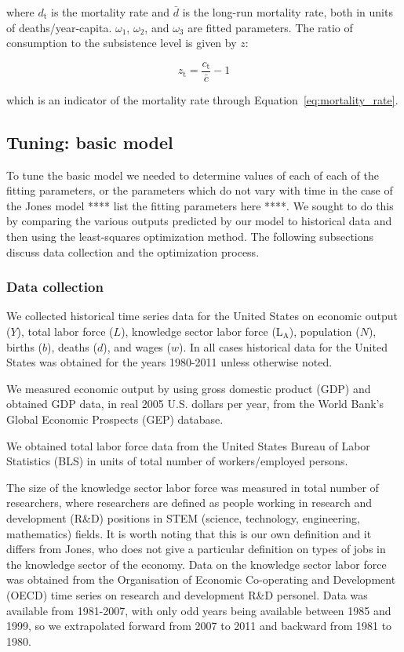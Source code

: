 \documentclass[letterpaper,12pt]{article}
\begin{document}
\noindent where $d_\mathrm{t}$ is the mortality rate and $\bar d$ is the long-run mortality rate, both in units of deaths/year-capita. $\omega_\mathrm{1}$, $\omega_\mathrm{2}$, and $\omega_\mathrm{3}$ are fitted parameters. The ratio of consumption to the subsistence level is given by $z$:

\begin{equation} \label{eq:z}
	z_\mathrm{t} = \frac{c_\mathrm{t}}{\bar c} - 1
\end{equation}

\noindent which is an indicator of the mortality rate through Equation~\ref{eq:mortality_rate}.

\subsection{Tuning: basic model}
\label{sec:Tuning_basic_model}

To tune the basic model we needed to determine values of each of each of the fitting parameters, or the parameters which do not vary with time in the case of the Jones model **** list the fitting parameters here ****. We sought to do this by comparing the various outputs predicted by our model to historical data and then using the least-squares optimization method. The following subsections discuss data collection and the optimization process.

\subsubsection{Data collection}
We collected historical time series data for the United States on economic output ($Y$), total labor force ($L$), knowledge sector labor force (L$_\mathrm{A}$), population ($N$), births ($b$), deaths ($d$), and wages ($w$). In all cases historical data for the United States was obtained for the years 1980-2011 unless otherwise noted. 

We measured economic output by using gross domestic product (GDP) and obtained GDP data, in real 2005 U.S. dollars per year, from the World Bank's Global Economic Prospects (GEP) database. 

We obtained total labor force data from the United States Bureau of Labor Statistics (BLS) in units of total number of workers/employed persons.

The size of the knowledge sector labor force was measured in total number of researchers, where researchers are defined as people working in research and development (R\&D) positions in STEM (science, technology, engineering, mathematics) fields. It is worth noting that this is our own definition and it differs from Jones, who does not give a particular definition on types of jobs in the knowledge sector of the economy. Data on the knowledge sector labor force was obtained from the Organisation of Economic Co-operating and Development (OECD) time series on research and development R\&D personel. Data was available from 1981-2007, with only odd years being available between 1985 and 1999, so we extrapolated forward from 2007 to 2011 and backward from 1981 to 1980.
\end{document}
